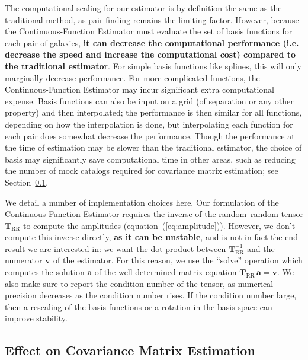 \documentclass[modern]{aastex62}
\newcommand{\est}{the Continuous-Function Estimator\xspace}
\newcommand{\eqt}[1]{equation~(\ref{#1})}
\newcommand{\inv}{^{-1}}
\newcommand{\bld}[1]{\bm{#1}}
\newcommand{\vv}[1]{\bld{v}_\mathrm{#1}}
\newcommand{\TT}[1]{\bld{T}_\mathrm{#1}}
\newcommand{\new}[1]{\textbf{#1}}
\begin{document}
The computational scaling for our estimator is by definition the same as the traditional method, as pair-finding remains the limiting factor.
However, because \est must evaluate the set of basis functions for each pair of galaxies, \new{it can decrease the computational performance (i.e. decrease the speed and increase the computational cost) compared to the traditional estimator}.
For simple basis functions like splines, this will only marginally decrease performance.
For more complicated functions, \est may incur significant extra computational expense.
Basis functions can also be input on a grid (of separation or any other property) and then interpolated; the performance is then similar for all functions, depending on how the interpolation is done, but interpolating each function for each pair does somewhat decrease the performance.
Though the performance at the time of estimation may be slower than the traditional estimator, the choice of basis may significantly save computational time in other areas, such as reducing the number of mock catalogs required for covariance matrix estimation; see Section~\ref{sec:covariance}.

We detail a number of implementation choices here.
Our formulation of \est requires the inverse of the random--random tensor $\TT{RR}$ to compute the amplitudes (\eqt{eq:amplitude}).
However, we don't compute this inverse directly, \new{as it can be unstable}, and is not in fact the end result we are interested in: we want the dot product between $\TT{RR}\inv$ and the numerator $\vv{}$ of the estimator.
For this reason, we use the ``solve'' operation which computes the solution $\bld{a}$ of the well-determined matrix equation $\TT{RR}\,\bld{a}=\bld{v}$.
We also make sure to report the condition number of the tensor, as numerical precision decreases as the condition number rises.
If the condition number large, then a rescaling of the basis functions or a rotation in the basis space can improve stability.

\subsection{Effect on Covariance Matrix Estimation}
\label{sec:covariance}
\end{document}
